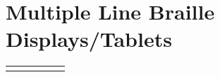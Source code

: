 \documentclass[14pt,letterpaper,twoside]{extreport}
\begin{document}
\pagebreak \hypertarget{multiple-line-refreshable-braille-displaystablets}{%
	\section{Multiple Line Braille Displays/Tablets}\label{multiple-line-refreshable-braille-displaystablets}}


\begin{longtable}[]{@{}
	>{\raggedright\arraybackslash}m{}
	>{\raggedright\arraybackslash}m{}
	>{\raggedright\arraybackslash}m{}
	>{\raggedright\arraybackslash}m{}
	>{\raggedright\arraybackslash}m{}
	>{\raggedright\arraybackslash}m{}@{}
	}
	\toprule\noalign{}


\end{longtable}
\end{document}
